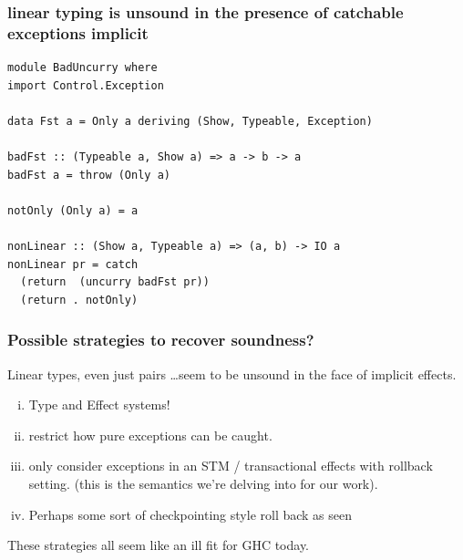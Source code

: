 \documentclass[11pt,reqno]{beamer}
\begin{document}

\begin{frame}[fragile]
\frametitle{linear typing is unsound in the presence of catchable exceptions implicit }
\begin{verbatim}
module BadUncurry where
import Control.Exception

data Fst a = Only a deriving (Show, Typeable, Exception)

badFst :: (Typeable a, Show a) => a -> b -> a
badFst a = throw (Only a)

notOnly (Only a) = a

nonLinear :: (Show a, Typeable a) => (a, b) -> IO a
nonLinear pr = catch
  (return  (uncurry badFst pr))
  (return . notOnly)
\end{verbatim}
\end{frame}

\begin{frame}\frametitle{Possible strategies to recover soundness?}
Linear types, even just pairs \ldots seem to be unsound in the
face of implicit effects.

\begin{enumerate}[(i)]
  \item Type and Effect systems!  %
  \item restrict how pure exceptions can be caught.
  \item only consider exceptions in an STM / transactional effects with rollback setting.
        (this is the semantics we're delving into for our work).
  \item Perhaps some sort of checkpointing style roll back as seen
\end{enumerate}

These strategies all seem like an ill fit for GHC today.

\end{frame}
\end{document}

